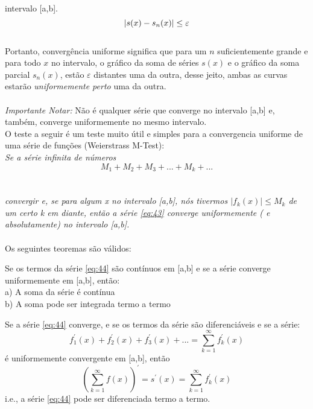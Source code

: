 intervalo [a,b].\\
\begin{equation}
\notag
    |s(x) - s_n(x)| \leq \varepsilon
\end{equation}
\\
Portanto, convergência uniforme significa que para um $n$ suficientemente 
grande e para todo $x$ no intervalo, o gráfico da soma de séries $s(x)$ e o 
gráfico da soma parcial $s_n(x)$, estão $\varepsilon$ distantes uma da outra,
desse jeito, ambas as curvas estarão \textit{uniformemente perto} uma da outra.\\
\\
\textit{Importante Notar:}
Não é qualquer série que converge no intervalo [a,b] e, também, converge uniformemente
no mesmo intervalo.\\

O teste a seguir é um teste muito útil e simples para a convergencia uniforme
de uma série de funções (Weierstrass M-Test):\\
\textit{
    Se a série infinita de números \\
    \begin{equation}
        M_1 + M_2 + M_3 + ... + M_k + ...
    \end{equation}
    \\
    \\
    convergir e, se para algum x no intervalo [a,b], nós tivermos $|f_k(x)| \leq M_k$
    de um certo k em diante, então a série \ref{eq:43} converge uniformemente ( e 
    absolutamente) no intervalo [a,b].
} 
\\
\\

Os seguintes teoremas são válidos:

\begin{teorema}
    Se os termos da série \ref{eq:44} são contínuos em [a,b] e se a
    série converge uniformemente em [a,b], então:\\
    a) A soma da série é contínua\\
    b) A soma pode ser integrada termo a termo
\label{teo:unifConv}
\end{teorema}

\begin{teorema}
    Se a série \ref{eq:44} converge, e se os termos da série são diferenciáveis
    e se a série:\\
    \begin{equation}
        f_1^{'}(x) + f_2^{'}(x) + f_3^{'}(x) + ... = \sum\limits_{k=1}^{\infty}f_k^{'}(x)
    \end{equation}
    é uniformemente convergente em [a,b], então\\
    \begin{equation}
        (\sum\limits_{k=1}^{\infty} f(x))^{'} = s^{'}(x) = \sum\limits_{k=1}^{\infty}f_k^{'}(x)
    \end{equation}
    i.e., a série \ref{eq:44} pode ser diferenciada termo a termo.
\end{teorema}